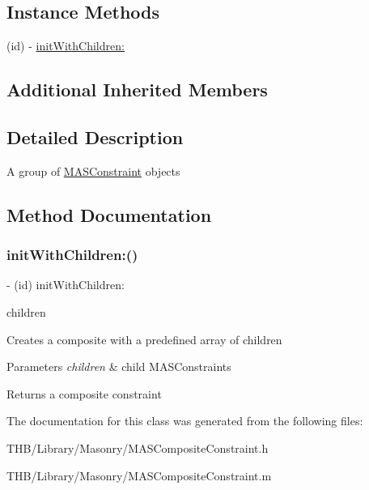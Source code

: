 \subsection*{Instance Methods}
\begin{DoxyCompactItemize}
\item 
(id) -\/ \mbox{\hyperlink{interface_m_a_s_composite_constraint_a97b95d5731ad37675d559962e93bb155}{init\+With\+Children\+:}}
\end{DoxyCompactItemize}
\subsection*{Additional Inherited Members}


\subsection{Detailed Description}
A group of \mbox{\hyperlink{interface_m_a_s_constraint}{M\+A\+S\+Constraint}} objects 

\subsection{Method Documentation}
\mbox{\label{interface_m_a_s_composite_constraint_a97b95d5731ad37675d559962e93bb155}} 
\subsubsection{\texorpdfstring{init\+With\+Children\+:()}{initWithChildren:()}}
{\footnotesize\ttfamily -\/ (id) init\+With\+Children\+: \begin{DoxyParamCaption}\item[{(N\+S\+Array $\ast$)}]{children }\end{DoxyParamCaption}}

Creates a composite with a predefined array of children


\begin{DoxyParams}{Parameters}
{\em children} & child M\+A\+S\+Constraints\\
\hline
\end{DoxyParams}
\begin{DoxyReturn}{Returns}
a composite constraint 
\end{DoxyReturn}


The documentation for this class was generated from the following files\+:\begin{DoxyCompactItemize}
\item 
T\+H\+B/\+Library/\+Masonry/M\+A\+S\+Composite\+Constraint.\+h\item 
T\+H\+B/\+Library/\+Masonry/M\+A\+S\+Composite\+Constraint.\+m\end{DoxyCompactItemize}
